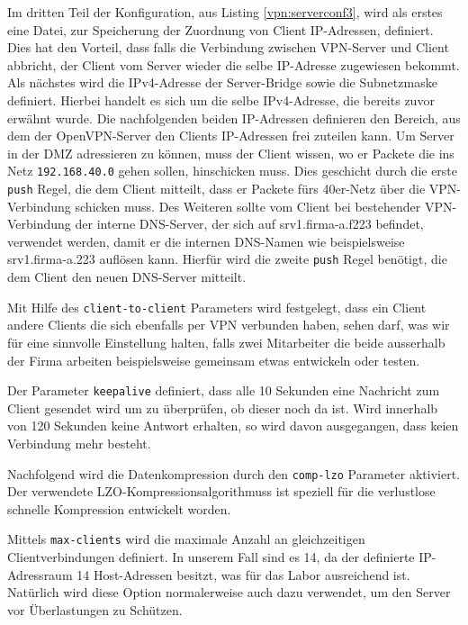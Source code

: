 

Im dritten Teil der Konfiguration, aus Listing \ref{vpn:serverconf3}, wird als erstes eine Datei, zur Speicherung der Zuordnung von Client IP-Adressen, definiert. Dies hat den Vorteil, dass falls die Verbindung zwischen VPN-Server und Client abbricht, der Client vom Server wieder die selbe IP-Adresse zugewiesen bekommt. Als nächstes wird die IPv4-Adresse der Server-Bridge sowie die Subnetzmaske definiert. Hierbei handelt es sich um die selbe IPv4-Adresse, die bereits zuvor erwähnt wurde. Die nachfolgenden beiden IP-Adressen definieren den Bereich, aus dem der OpenVPN-Server den Clients IP-Adressen frei zuteilen kann. Um Server in der DMZ adressieren zu können, muss der Client wissen, wo er Packete die ins Netz \texttt{192.168.40.0} gehen sollen, hinschicken muss. Dies geschicht durch die erste \texttt{push} Regel, die dem Client mitteilt, dass er Packete fürs 40er-Netz über die VPN-Verbindung schicken muss.
Des Weiteren sollte vom Client bei bestehender VPN-Verbindung der interne DNS-Server, der sich auf srv1.firma-a.f223 befindet, verwendet werden, damit er die internen DNS-Namen wie beispielsweise srv1.firma-a.223 auflösen kann. Hierfür wird die zweite \texttt{push} Regel benötigt, die dem Client den neuen DNS-Server mitteilt.

Mit Hilfe des \texttt{client-to-client} Parameters wird festgelegt, dass ein Client andere Clients die sich ebenfalls per VPN verbunden haben, sehen darf, was wir für eine sinnvolle Einstellung halten, falls zwei Mitarbeiter die beide ausserhalb der Firma arbeiten beispielsweise gemeinsam etwas entwickeln oder testen.

Der Parameter \texttt{keepalive} definiert, dass alle 10 Sekunden eine Nachricht zum Client gesendet wird um zu überprüfen, ob dieser noch da ist. Wird innerhalb von 120 Sekunden keine Antwort erhalten, so wird davon ausgegangen, dass keien Verbindung mehr besteht.

Nachfolgend wird die Datenkompression durch den \texttt{comp-lzo} Parameter aktiviert. Der verwendete LZO-Kompressionsalgorithmuss ist speziell für die verlustlose schnelle Kompression entwickelt worden.

Mittels \texttt{max-clients} wird die maximale Anzahl an gleichzeitigen Clientverbindungen definiert. In unserem Fall sind es 14, da der definierte IP-Adressraum 14 Host-Adressen besitzt, was für das Labor ausreichend ist. Natürlich wird diese Option normalerweise auch dazu verwendet, um den Server vor Überlastungen zu Schützen.

